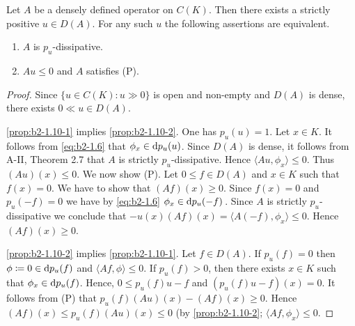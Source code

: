 \begin{proposition}\label{prop:b2-1.10}
%
Let $A$ be a densely defined operator on $C(K)$.
Then there exists a strictly positive $u \in D(A)$.
For any such $u$ the following assertions are equivalent.
\begin{enumerate}[\upshape (a)]
\item  \label{prop:b2-1.10-1}
$A$ is $p_{u}$-dissipative.

\item  \label{prop:b2-1.10-2}
$Au \leq 0$ and $A$ satisfies (P).
\end{enumerate}
\end{proposition}

\begin{proof}
Since $\{u \in C(K) \colon u \gg 0\}$ is open and non-empty and $D(A)$ is dense, there exists $0 \ll u \in D(A)$.

\ref{prop:b2-1.10-1} implies  \ref{prop:b2-1.10-2}.
One has $p_{u}(u) = 1$.
Let $x \in K$.
It follows from \eqref{eq:b2-1.6} that $\phi_{x} \in \mathop{}\!\mathrm{d}{p}_{u}(u)$.
Since $D(A)$ is dense, it follows from A-II, Theorem 2.7
that $A$ is strictly $p_{u}$-dissipative.
Hence $\langle Au,\phi_{x} \rangle \leq 0$.
Thus $(Au)(x) \leq 0$.
We now show (P).
Let $0 \leq f \in D(A)$ and $x \in K$ such that $f(x) = 0$.
We have to show that $(Af)(x) \geq 0$.
Since $f(x) = 0$ and $p_{u}(-f) = 0$ we have by \eqref{eq:b2-1.6}  $\phi_{x} \in \mathop{}\!\mathrm{d}{p}_{u}(-f)$\,.
Since $A$ is strictly $p_{u}$-dissipative we conclude that $-u(x)(Af)(x) = \langle A(-f),\phi_{x} \rangle \leq 0$.
Hence $(Af)(x) \geq 0$.

\ref{prop:b2-1.10-2} implies \ref{prop:b2-1.10-1}.
Let $f \in D(A)$.
If $p_{u}(f) = 0$ then $\phi \coloneqq 0 \in \mathop{}\!\mathrm{d}{p}_{u}(f)$ and $\langle Af,\phi \rangle \leq 0$.
If $p_{u}(f) > 0$, then there exists $x \in K$ such that $\phi_{x} \in \mathop{}\!\mathrm{d}{p}_{u}(f)$.
Hence, $0 \leq p_{u}(f)u - f$ and $(p_{u}(f)u - f)(x) = 0$.
It follows from (P) that $p_{u}(f)(Au)(x) - (Af)(x) \geq 0$.
Hence $(Af)(x) \leq p_{u}(f)(Au)(x) \leq 0$ (by \ref{prop:b2-1.10-2}; \ie  $\langle Af,\phi_{x} \rangle \leq 0$.
\end{proof}

